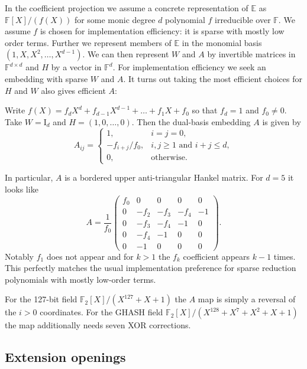 \documentclass[11pt,letterpaper,usenames,dvipsnames]{article}
\begin{document}
In the coefficient projection we assume a concrete representation of $\mathbb{E}$ as $\mathbb{F}[X]/(f(X))$ for some monic degree $d$ polynomial $f$ irreducible over $\mathbb{F}$. We assume $f$ is chosen for implementation efficiency: it is sparse with mostly low order terms. Further we represent members of $\mathbb{E}$ in the monomial basis $(1, X, X^2, \dots, X^{d-1})$. We can then represent $W$ and $A$ by invertible matrices in $\mathbb{F}^{d \times d}$ and $H$ by a vector in $\mathbb{F}^d$. For implementation efficiency we seek an embedding with sparse $W$ and $A$. It turns out taking the most efficient choices for $H$ and $W$ also gives efficient $A$:

\begin{theorem}
Write  $f(X)= f_d X^d + f_{d-1} X^{d-1} + \hdots + f_1 X + f_0$ so that $f_d =1$ and $f_0 \neq 0$. Take $W=\mathrm{I}_d$ and $H=(1, 0, \dots, 0)$. Then the dual-basis embedding $A$ is given by
\[
A_{ij}=
\begin{cases}
1,&i=j=0,\\
-f_{i+j}/f_0,&i,j\ge1\text{ and }i+j\le d,\\
0,&\text{otherwise}.
\end{cases}
\]
\end{theorem}

In particular, $A$ is a bordered upper anti-triangular Hankel matrix. For $d=5$ it looks like
\[
A= \frac{1}{f_0}
\begin{pmatrix}
f_0 & 0 & 0 & 0 & 0\\
0 & -f_2 & -f_3 & -f_4 & -1\\
0 & -f_3 & -f_4 & -1 & 0\\
0 & -f_4 & -1 & 0 & 0\\
0 & -1 & 0 & 0 & 0
\end{pmatrix}.
\]
Notably $f_1$ does not appear and for $k>1$ the $f_k$ coefficient appears $k-1$ times. This perfectly matches the usual implementation preference for sparse reduction polynomials with mostly low-order terms.

For the 127-bit field $\mathbb{F}_2[X]/(X^{127} + X + 1)$ the $A$ map is simply a reversal of the $i>0$ coordinates. For the GHASH field $\mathbb{F}_2[X]/(X^{128} + X^7 + X^2 + X + 1)$ the map additionally needs seven XOR corrections.


\subsection{Extension openings}
\end{document}
